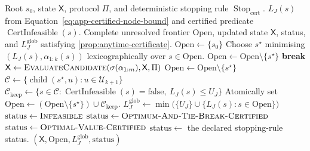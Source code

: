 \documentclass[a4paper,onecolumn,11pt,unpublished]{quantumarticle}
\theoremstyle{remark}
\begin{document}
\begin{algorithm}[H]
\caption{Anytime branch-and-bound certification}
\label{alg:app-branch-and-bound}
\begin{algorithmic}[1]
\Require Root $s_0$, state $\mathsf X$, protocol $\Pi$, and deterministic stopping rule
$\operatorname{Stop}_{\mathrm{cert}}$.
\Require $L_J(s)$ from Equation~\eqref{eq:app-certified-node-bound} and certified
predicate $\operatorname{CertInfeasible}(s)$.
\Ensure Complete unresolved frontier $\mathrm{Open}$, updated state $\mathsf X$,
status, and $L_J^{\mathrm{glob}}$ satisfying \cref{prop:anytime-certificate}.
\State $\mathrm{Open}\gets\{s_0\}$
    \State Choose $s^\star$ minimising
    $(L_J(s),\alpha_{1:k}(s))$ lexicographically over $s\in\mathrm{Open}$.
        \State $\mathrm{Open}\gets\mathrm{Open}\setminus\{s^\star\}$
            \State \textbf{break}
        \EndIf
        \State $\mathsf X\gets
        \Call{EvaluateCandidate}{\sigma(\alpha_{1:m}),\mathsf X,\Pi}$
        \State $\mathrm{Open}\gets\mathrm{Open}\setminus\{s^\star\}$
    \Else
        \State $\mathcal C\gets
        \{\operatorname{child}(s^\star,u):u\in\mathcal U_{k+1}\}$
        \State $\mathcal C_{\mathrm{keep}}\gets
        \{s\in\mathcal C:
        \operatorname{CertInfeasible}(s)=\mathrm{false},\ L_J(s)\le U_J\}$
        \State Atomically set
        $\mathrm{Open}\gets
        (\mathrm{Open}\setminus\{s^\star\})\cup\mathcal C_{\mathrm{keep}}$.
    \EndIf
\EndWhile
\State $L_J^{\mathrm{glob}}\gets
\min\bigl(\{U_J\}\cup\{L_J(s):s\in\mathrm{Open}\}\bigr)$
    \State $\mathrm{status}\gets\textsc{Infeasible}$
    \State $\mathrm{status}\gets\textsc{Optimum-And-Tie-Break-Certified}$
    \State $\mathrm{status}\gets\textsc{Optimal-Value-Certified}$
\Else
    \State $\mathrm{status}\gets$ the declared stopping-rule status.
\EndIf
\State \Return $(\mathsf X,\mathrm{Open},L_J^{\mathrm{glob}},\mathrm{status})$
\end{algorithmic}
\end{algorithm}
\end{document}
